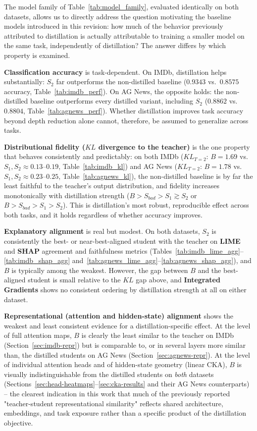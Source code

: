 \documentclass[conference]{IEEEtran}
\begin{document}
The model family of Table~\ref{tab:model_family}, evaluated identically on both datasets, allows us to directly address the question motivating the baseline models introduced in this revision: how much of the behavior previously attributed to distillation is actually attributable to training a smaller model on the same task, independently of distillation? The answer differs by which property is examined.

\textbf{Classification accuracy} is task-dependent. On IMDb, distillation helps substantially: $S_2$ far outperforms the non-distilled baseline ($0.9343$ vs.\ $0.8575$ accuracy, Table~\ref{tab:imdb_perf}). On AG News, the opposite holds: the non-distilled baseline outperforms every distilled variant, including $S_2$ ($0.8862$ vs.\ $0.8804$, Table~\ref{tab:agnews_perf}). Whether distillation improves task accuracy beyond depth reduction alone cannot, therefore, be assumed to generalize across tasks.

\textbf{Distributional fidelity ($KL$ divergence to the teacher)} is the one property that behaves consistently and predictably: on both IMDb ($KL_{T=2}$: $B=1.69$ vs.\ $S_1,S_2\approx0.13$--$0.19$, Table~\ref{tab:imdb_kl}) and AG News ($KL_{T=2}$: $B=1.78$ vs.\ $S_1,S_2\approx0.23$--$0.25$, Table~\ref{tab:agnews_kl}), the non-distilled baseline is by far the least faithful to the teacher's output distribution, and fidelity increases monotonically with distillation strength ($B>S_{bad}>S_1\gtrsim S_2$ or $B>S_{bad}>S_1>S_2$). This is distillation's most robust, reproducible effect across both tasks, and it holds regardless of whether accuracy improves.

\textbf{Explanatory alignment} is real but modest. On both datasets, $S_2$ is consistently the best- or near-best-aligned student with the teacher on \textbf{LIME} and \textbf{SHAP} agreement and faithfulness metrics (Tables~\ref{tab:imdb_lime_agg}--\ref{tab:imdb_shap_agg} and~\ref{tab:agnews_lime_agg}--\ref{tab:agnews_shap_agg}), and $B$ is typically among the weakest. However, the gap between $B$ and the best-aligned student is small relative to the $KL$ gap above, and \textbf{Integrated Gradients} shows no consistent ordering by distillation strength at all on either dataset.

\textbf{Representational (attention and hidden-state) alignment} shows the weakest and least consistent evidence for a distillation-specific effect. At the level of full attention maps, $B$ is clearly the least similar to the teacher on IMDb (Section~\ref{sec:imdb-repr}) but is comparable to, or in several layers more similar than, the distilled students on AG News (Section~\ref{sec:agnews-repr}). At the level of individual attention heads and of hidden-state geometry (linear CKA), $B$ is visually indistinguishable from the distilled students on \emph{both} datasets (Sections~\ref{sec:head-heatmaps}--\ref{sec:cka-results} and their AG News counterparts) -- the clearest indication in this work that much of the previously reported "teacher-student representational similarity" reflects shared architecture, embeddings, and task exposure rather than a specific product of the distillation objective.
\end{document}
